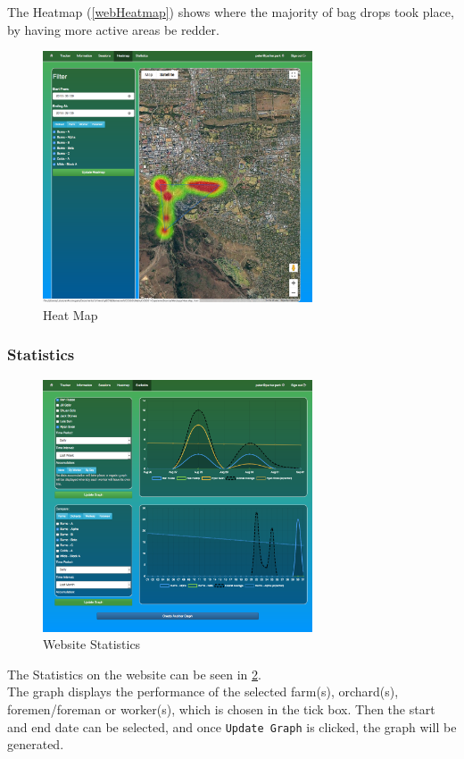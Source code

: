 \documentclass[11pt]{article}
\begin{document}
The Heatmap (\ref{webHeatmap}) shows where the majority of bag drops took place, by having more active areas be redder.

\begin{figure}
 \centering
 \includegraphics[width=8cm, keepaspectratio]{Images/UsingSystem/WebHeatmap.png}
 \caption{Heat Map}
 \label{HeatMap}
\end{figure}

\subsubsection{Statistics}
\label{webStatistics}

\begin{figure}
 \centering
 \includegraphics[width=8cm, keepaspectratio]{Images/UsingSystem/WebStats.png}
 \caption{Website Statistics}
 \label{webStatsImg}
\end{figure}

The Statistics on the website can be seen in \ref{webStatsImg}. \\
The graph displays the performance of the selected farm(s), orchard(s), foremen/foreman or worker(s), which is chosen in the tick box. Then the start and end date can be selected, and once \texttt{Update Graph} is clicked, the graph will be generated.\\
\end{document}
